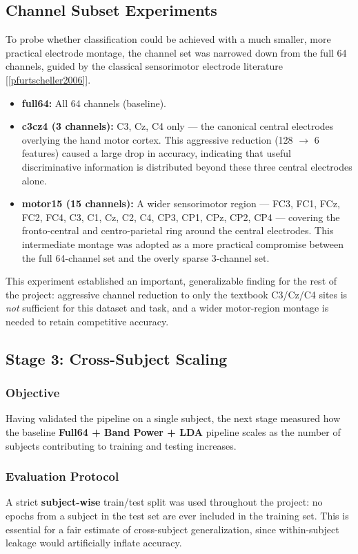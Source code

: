 \documentclass[11pt,a4paper]{article}
\renewcommand{\cite}[1]{[\ref{#1}]}
\begin{document}
\subsection{Channel Subset Experiments}
To probe whether classification could be achieved with a much smaller, more practical electrode montage, the channel set was narrowed down from the full 64 channels, guided by the classical sensorimotor electrode literature \cite{pfurtscheller2006}.

\begin{itemize}[leftmargin=1.5em]
    \item \textbf{full64:} All 64 channels (baseline).
    \item \textbf{c3cz4 (3 channels):} C3, Cz, C4 only --- the canonical central electrodes overlying the hand motor cortex. This aggressive reduction (128 $\rightarrow$ 6 features) caused a large drop in accuracy, indicating that useful discriminative information is distributed beyond these three central electrodes alone.
    \item \textbf{motor15 (15 channels):} A wider sensorimotor region --- FC3, FC1, FCz, FC2, FC4, C3, C1, Cz, C2, C4, CP3, CP1, CPz, CP2, CP4 --- covering the fronto-central and centro-parietal ring around the central electrodes. This intermediate montage was adopted as a more practical compromise between the full 64-channel set and the overly sparse 3-channel set.
\end{itemize}

This experiment established an important, generalizable finding for the rest of the project: aggressive channel reduction to only the textbook C3/Cz/C4 sites is \emph{not} sufficient for this dataset and task, and a wider motor-region montage is needed to retain competitive accuracy.

\subsection{Stage 3: Cross-Subject Scaling}

\subsubsection{Objective}
Having validated the pipeline on a single subject, the next stage measured how the baseline \textbf{Full64 + Band Power + LDA} pipeline scales as the number of subjects contributing to training and testing increases.

\subsubsection{Evaluation Protocol}
A strict \textbf{subject-wise} train/test split was used throughout the project: no epochs from a subject in the test set are ever included in the training set. This is essential for a fair estimate of cross-subject generalization, since within-subject leakage would artificially inflate accuracy.
\end{document}
